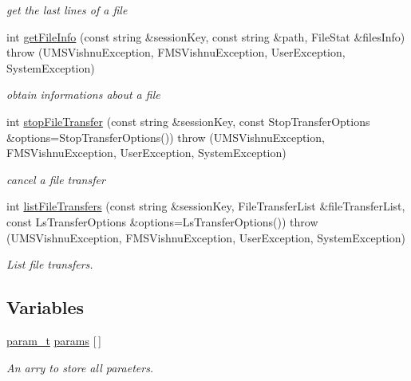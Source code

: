 \begin{DoxyCompactItemize}
\begin{DoxyCompactList}\small\item\em get the last lines of a file \item\end{DoxyCompactList}\item 
int \hyperlink{namespacevishnu_a3da75d7c75b5d6a58112f62c5b3eeae0}{getFileInfo} (const string \&sessionKey, const string \&path, FileStat \&filesInfo)  throw (UMSVishnuException, FMSVishnuException, UserException, SystemException)
\begin{DoxyCompactList}\small\item\em obtain informations about a file \item\end{DoxyCompactList}\item 
int \hyperlink{namespacevishnu_ac7f9c1d4391157b7dddaab5051fd44a8}{stopFileTransfer} (const string \&sessionKey, const StopTransferOptions \&options=StopTransferOptions())  throw (UMSVishnuException, FMSVishnuException, UserException, SystemException)
\begin{DoxyCompactList}\small\item\em cancel a file transfer \item\end{DoxyCompactList}\item 
int \hyperlink{namespacevishnu_a5159cd0b198000c690a1e9f88abb1329}{listFileTransfers} (const string \&sessionKey, FileTransferList \&fileTransferList, const LsTransferOptions \&options=LsTransferOptions())  throw (UMSVishnuException, FMSVishnuException, UserException, SystemException)
\begin{DoxyCompactList}\small\item\em List file transfers. \item\end{DoxyCompactList}\end{DoxyCompactItemize}
\subsection*{Variables}
\begin{DoxyCompactItemize}
\item 
\hypertarget{namespacevishnu_a1ca7d1d1baf7cebd2530d93b9f064bd9}{
\hyperlink{structvishnu_1_1param__t}{param\_\-t} \hyperlink{namespacevishnu_a1ca7d1d1baf7cebd2530d93b9f064bd9}{params} \mbox{[}$\,$\mbox{]}}
\label{namespacevishnu_a1ca7d1d1baf7cebd2530d93b9f064bd9}

\begin{DoxyCompactList}\small\item\em An arry to store all paraeters. \item\end{DoxyCompactList}\end{DoxyCompactItemize}


